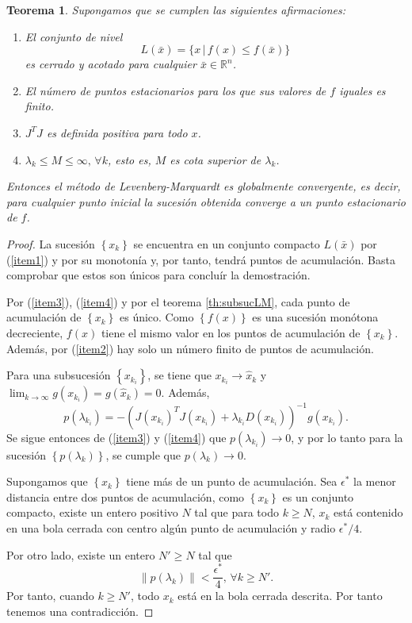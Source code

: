 \documentclass[11pt,a4paper]{book}
\newtheorem{theorem}{Teorema}[chapter]
\theoremstyle{definition}
\theoremstyle{remark}
\newcommand{\norm}[1]{\left\lVert#1\right\rVert}
\newcommand{\sucesionxk}{\left\{x_k\right\}}
\newcommand{\sucesion}[1]{\left\{#1\right\}}
\begin{document}
\begin{theorem}
	Supongamos que se cumplen las siguientes afirmaciones:
	\begin{enumerate}
		\item\label{item1}
		El conjunto de nivel
		\begin{equation*}
			L(\bar x) = \{x\,|\,f(x)\leq f(\bar x)\}
		\end{equation*}
		es cerrado y acotado para cualquier $\bar x \in \mathbb{R}^n$.
		\item\label{item2}
		El número de puntos estacionarios para los que sus valores de $f$
		iguales es finito.
		\item\label{item3}
		$J^TJ$ es definida positiva para todo $x$.
		\item\label{item4}
		$\lambda_k \leq M \leq \infty, \, \forall k$, esto es,
		$M$ es cota superior de $\lambda_k$.
	\end{enumerate}
	Entonces el método de Levenberg-Marquardt es globalmente convergente, es decir, para cualquier punto inicial la sucesión obtenida converge a un punto estacionario de $f$.
\end{theorem}
\begin{proof}
La sucesión $\sucesionxk$ se encuentra en un conjunto compacto $L(\bar x)$ por
(\ref{item1}) y por su monotonía y, por tanto, tendrá puntos de acumulación. Basta comprobar que estos son únicos para concluír la demostración.

Por (\ref{item3}), (\ref{item4}) y por el teorema \ref{th:subsucLM}, cada punto de acumulación de $\sucesionxk$ es único. Como $\sucesion{f(x)}$ es una sucesión monótona decreciente, $f(x)$ tiene el mismo valor en los puntos de acumulación de $\sucesionxk$. Además, por (\ref{item2}) hay solo un número finito de puntos de acumulación.

Para una subsucesión $\sucesion{x_{k_i}}$, se tiene que $x_{k_i} \to \hat x_k$ y $\lim_{k\to\infty}g(x_{k_i})=g(\hat x_k)=0$. Además,
\begin{equation}
	p(\lambda_{k_i})=
	-(J(x_{k_i})^TJ(x_{k_i}) + \lambda_{k_i}D(x_{k_i}))^{-1}g(x_{k_i}).
\end{equation}
Se sigue entonces de (\ref{item3}) y (\ref{item4}) que $p(\lambda_{k_i})\to 0$, y por lo tanto para la sucesión $\sucesion{p(\lambda_k)}$, se cumple que $p(\lambda_k)\rightarrow 0$.

Supongamos que $\sucesionxk$ tiene más de un punto de acumulación. Sea $\epsilon^*$ la menor distancia entre dos puntos de acumulación, como $\sucesionxk$ es un conjunto compacto, existe un entero positivo $N$ tal que para todo $k \geq N$, $x_k$ está contenido en una bola cerrada con centro algún punto de acumulación y radio $\epsilon^*/4$.

Por otro lado, existe un entero $N'\geq N$ tal que
\begin{equation}
	\norm{p(\lambda_k)}<\frac{\epsilon^*}{4},\,\forall k\geq N'.
\end{equation}
Por tanto, cuando $k\geq N'$, todo $x_k$ está en la bola cerrada descrita. Por tanto tenemos una contradicción.
\end{proof}
\end{document}
